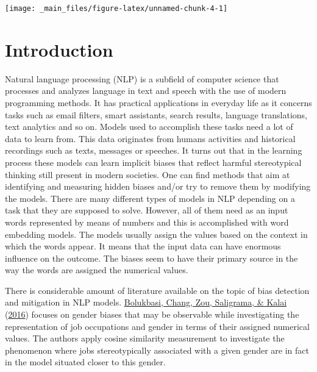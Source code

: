 \documentclass[12pt,]{book}
\begin{document}
\vspace{1mm} \footnotesize

\begin{center}\texttt{[image: \_main\_files/figure-latex/unnamed-chunk-4-1]} \end{center}

\normalsize

\hypertarget{introduction}{%
\chapter{Introduction}\label{introduction}}

Natural language processing (NLP) is a subfield of computer science that processes and analyzes language in text and speech
with the use of modern programming methods. It has practical applications in everyday life as it concerns tasks such as email filters,
smart assistants, search results, language translations, text analytics and so on. Models used to accomplish these tasks need a lot of
data to learn from. This data originates from humans activities and historical recordings such as texts, messages or speeches. It turns out
that in the learning process these models can learn implicit biases that reflect harmful stereotypical thinking still present in modern societies. One can find methods that aim at identifying and measuring hidden biases and/or try to remove them by modifying the models.
There are many different types of models in NLP depending on a task that they are supposed to solve. However, all of them need as an input words represented by means of numbers and this is accomplished with word embedding models. The models usually assign the values based on the context in which the words appear. It means that the input data can have enormous influence on the outcome. The biases seem to have their primary source in the way the words are assigned the numerical values.

There is considerable amount of literature available on the topic of bias detection and mitigation in NLP models. \protect\hyperlink{ref-Bolukbasi2016Man}{Bolukbasi, Chang, Zou, Saligrama, \& Kalai} (\protect\hyperlink{ref-Bolukbasi2016Man}{2016}) focuses on gender biases that may be observable while investigating the representation of job occupations and gender in terms of their assigned numerical
values. The authors apply cosine similarity measurement to investigate the phenomenon where jobs stereotypically associated with a given gender are in fact in the model situated closer to this gender.
\end{document}
